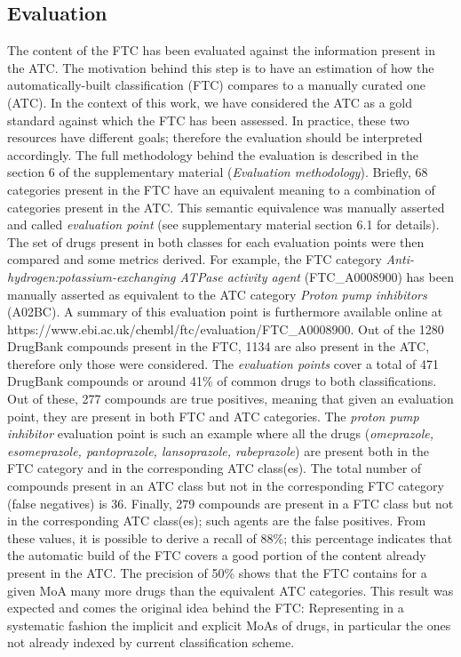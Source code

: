 \documentclass{bioinfo}
\begin{document}
\subsection{Evaluation}
The content of the FTC has been evaluated against the information present in the ATC. The motivation behind 
this step is to have an estimation of how the automatically-built classification (FTC) compares to a manually curated 
one (ATC). In the context of this work, we have considered the ATC as a gold standard against which the FTC 
has been assessed. In practice, these two resources have different goals; therefore the evaluation should be 
interpreted accordingly. The full methodology behind the evaluation is 
described in the section 6 of the supplementary material (\emph{Evaluation methodology}). 
Briefly, 68 categories present in the FTC have an equivalent meaning to a combination of categories present in the ATC. 
This semantic equivalence was manually asserted 
and called \emph{evaluation point} (see supplementary material section 6.1 for details). 
The set of drugs present in both classes for each evaluation points were then compared and some metrics derived. 
For example, the FTC category \emph{Anti-hydrogen:potassium-exchanging ATPase activity agent} (FTC\_A0008900) has 
been manually asserted as equivalent to the ATC category \emph{Proton pump inhibitors} (A02BC). A summary of this 
evaluation point is furthermore available online at {{https://www.ebi.ac.uk/chembl/ftc/evaluation/FTC\_A0008900}}.
Out of the 1280 DrugBank compounds present in the FTC, 1134 are also present in the ATC, therefore only those were 
considered. The \emph{evaluation points} cover a total of 471 DrugBank compounds or around 41\% of common drugs to both classifications.
Out of these, 277 compounds are true positives, 
meaning that given an evaluation point, they are present in both FTC and ATC categories. The \emph{proton pump inhibitor} 
evaluation point is such an example where all the drugs (\emph{omeprazole, esomeprazole, pantoprazole, lansoprazole, rabeprazole}) are 
present both in the FTC category and in the corresponding ATC class(es). The total number of compounds present in an ATC class but 
not in the corresponding FTC category (false negatives) is 36. Finally, 279 compounds are present in a FTC class but not in the 
corresponding ATC class(es); such agents are the false positives. From these values, it is possible to derive a 
recall of 88\%; this percentage indicates that the automatic build of the FTC covers a good portion of the content 
already present in the ATC. The precision of 50\% shows that the FTC contains for a given MoA many more drugs than the 
equivalent ATC categories. This result was expected and comes the original idea behind the FTC: Representing in a systematic fashion
the implicit and explicit MoAs of drugs, in particular the ones not already indexed by current classification scheme.
\end{document}
